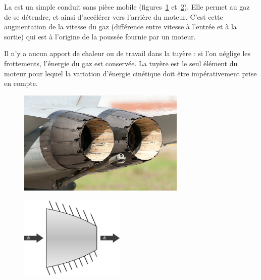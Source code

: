 		La  est un simple conduit sans pièce mobile (figures~\ref{fig_illustration_tuyere1} et~\ref{fig_illustration_tuyere2}). Elle permet au gaz de se détendre, et ainsi d’accélérer vers l’arrière du moteur. C’est cette augmentation de la vitesse du gaz (différence entre vitesse à l’entrée et à la sortie) qui est à l’origine de la poussée fournie par un moteur.

		Il n’y a aucun apport de chaleur ou de travail dans la tuyère : si l’on néglige les frottements, l’énergie du gaz est conservée. La tuyère est le seul élément du moteur pour lequel la variation d’énergie cinétique doit être impérativement prise en compte.

		\begin{figure}
			\begin{center}
				\includegraphics[width=8cm]{images/photo_tuyere.jpg}
			\end{center}
			\label{fig_illustration_tuyere1}
		\end{figure}

		\begin{figure}
			\begin{center}
				\includegraphics[width=5cm]{images/symbole_tuyere.png}
			\end{center}
			\label{fig_illustration_tuyere2}
		\end{figure}

